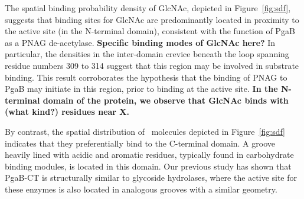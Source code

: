 {The spatial binding probability density of GlcNAc, depicted in Figure~\ref{fig:sdf}, suggests that binding sites for GlcNAc are predominantly located in proximity to the active site (in the N-terminal domain), consistent with the function of PgaB as a PNAG de-acetylase. \textbf{Specific binding modes of GlcNAc here?} In particular, the densities in the inter-domain crevice beneath the loop spanning residue numbers 309 to 314 suggest that this region may be involved in substrate binding. This result corroborates the hypothesis that the binding of PNAG to PgaB may initiate in this region, prior to binding at the active site.\cite{Little:2012dp}  \textbf{In the N-terminal domain of the protein, we observe that GlcNAc binds with (what kind?) residues near X.}




By contrast, the spatial distribution of \glucosamine\ molecules depicted in Figure~\ref{fig:sdf} indicates that they preferentially bind to the C-terminal domain. A groove heavily lined with acidic and aromatic residues, typically found in carbohydrate binding modules, is located in this domain. Our previous study has shown that PgaB-CT is structurally similar to glycoside hydrolases,\cite{Little:2012dp} where the active site for these enzymes is also located in analogous grooves with a similar geometry. 

}
